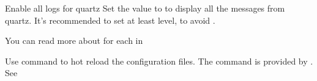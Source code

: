 \begin{Configuration}
{\begin{NestedList}
{\begin{NestedList}
                    \begin{example}{Enable all logs for quartz}
                        Set the value to  to display all the messages from quartz.
                        It's recommended to set at least  level, to avoid .
                    \end{example}

                \end{NestedList}

            }
        \end{NestedList}


    }

\end{Configuration}

\clearpage
{}
You can read more about  for each  in 

\begin{tips}{Use  command to hot reload the configuration files.}
    The  command is provided by .
    See~
\end{tips}
